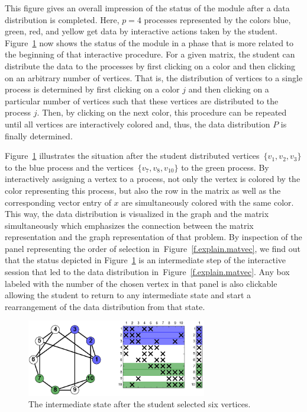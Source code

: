 \documentclass[12pt, twoside,a4paper,toc=bibliography]{scrbook}
\newcommand{\figref}[1]{Figure~\protect\ref{#1}}
\begin{document}
This figure gives an overall impression of the status of the module after a data
distribution is completed. Here, $p=4$ processes represented by the colors blue, green,
red, and yellow get data by interactive actions taken by the student.
Figure~\ref{f.beginning} now shows the status of the module in a phase that is more
related to the beginning of that interactive procedure. For a given matrix, the student
can distribute the data to the processes by first clicking on a color and then clicking
on an arbitrary number of vertices. That is, the distribution of vertices to a single
process is determined by first clicking on a color $j$ and then clicking on a particular
number of vertices such that these vertices are distributed to the process $j$.
Then, by clicking on the next color, this procedure can be repeated until
all vertices are interactively colored and, thus, the data distribution $P$ is finally
determined.

Figure~\ref{f.beginning} illustrates the situation after the student distributed
vertices~$\{ v_1, v_2, v_3 \}$ to the blue process
and the vertices~$\{ v_7, v_8, v_{10}\}$ to the green
process. By interactively assigning a vertex to a process, not only the vertex is colored
by the color representing this process, but also the row in the matrix as well as the
corresponding vector entry of $x$ are simultaneously colored with the same color.
This way, the data distribution is visualized in the graph and the matrix
simultaneously which emphasizes the connection between the matrix representation and the
graph representation of that problem. By inspection of the panel representing the order of selection
in~\figref{f.explain.matvec}, we find out that the status depicted in \figref{f.beginning} is an
intermediate step of the interactive session that led to the data distribution
in~\figref{f.explain.matvec}. Any box labeled with the number of the chosen vertex in that panel
is also clickable allowing the student to return to any intermediate state and start a
rearrangement of the data distribution from that state.

\begin{figure}
\centering
\includegraphics[width=0.7\textwidth]{twoColors}
\caption{The intermediate state after the student selected six vertices.}
\label{f.beginning}
\end{figure}
\end{document}
